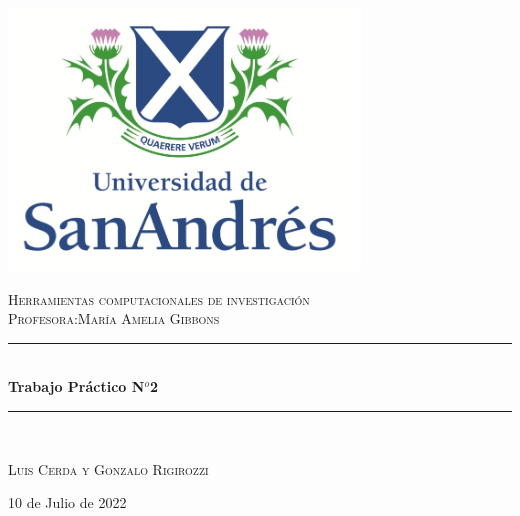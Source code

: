 \documentclass[12pt]{article} %
\begin{document}
\begin{titlepage} %
	\newcommand{\HRule}{\rule{\linewidth}{0.5mm}} %
	
	\center %
	
	\includegraphics[width=0.7\textwidth]{UdeSA.jpg}
	
	\textsc{\Large Herramientas computacionales de investigaci\'on  }\\[0.5cm] %
	
	\textsc{\large Profesora:María Amelia Gibbons }\\
	\vspace{0,15cm}
	\vspace{4pt}
	
	\textcolor{white}{\HRule}\\[0.6cm]
	\huge\bfseries Trabajo Práctico N$^{o}$2
	\textcolor{white}{\HRule}\\[1.5cm]
	\begin{center}
		\large
		\textsc{Luis Cerda y Gonzalo Rigirozzi}\\
	\end{center}
	
	\vfill\vfill\vfill %
	{\large 10 de Julio de 2022}
	\vfill
	
\end{titlepage}
\end{document}
